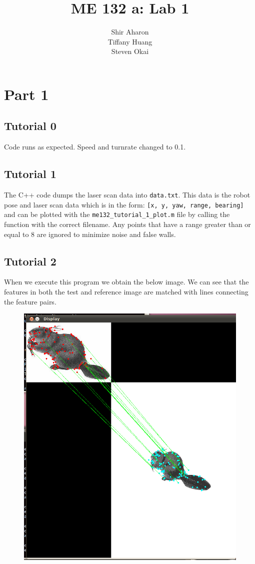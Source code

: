 \documentclass[10pt, titlepage, onecolumn, fleqn]{article}
\title{ME 132 a: Lab 1}
\author{Shir Aharon\\Tiffany Huang\\Steven Okai}
\begin{document}
\maketitle

\section{Part 1}

\subsection{Tutorial 0}
Code runs as expected. Speed and turnrate changed to 0.1.

\subsection{Tutorial 1}
The C++ code dumps the laser scan data into \verb|data.txt|. This data is the robot pose and laser scan data which is in the form: \verb|[x, y, yaw, range, bearing]| and can be plotted with the \verb|me132_tutorial_1_plot.m| file by calling the function with the correct filename. Any points that have a range greater than or equal to 8 are ignored to minimize noise and false walls.

\subsection{Tutorial 2}
When we execute this program we obtain the below image. We can see that the features in both the test and reference image are matched with lines connecting the feature pairs.
\begin{figure}[H]
\begin{center} \includegraphics[height=0.8\textwidth]{lab01/lab01_material/part1/me132_tutorial_camera/capture.png} \end{center} \label{name}
\end{figure}
\end{document}

